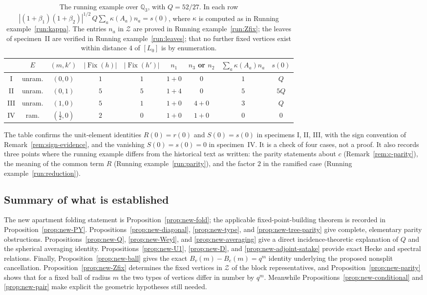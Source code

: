 \documentclass[12pt,letterpaper]{amsart}
\numberwithin{equation}{section}
\theoremstyle{definition}
\theoremstyle{plain}
\begin{document}
\begin{table}[htbp]
\centering
\small
\renewcommand{\arraystretch}{1.25}
\begin{tabular}{@{}ccccccccc@{}}
\toprule
 & $E$ & $(m,k')$ & $|\operatorname{Fix}(h)|$ & $|\operatorname{Fix}(h')|$
 & $n_1$ & $n_3$ or $n_2$ & $\sum_a\kappa(A_a)n_a$ & $s(0)$\\
\midrule
I & unram. & $(0,0)$ & $1$ & $1$ & $1+0$ & $0$ & $1$ & $Q$\\
II & unram. & $(0,1)$ & $5$ & $5$ & $1+4$ & $0$ & $5$ & $5Q$\\
III & unram. & $(1,0)$ & $5$ & $1$ & $1+0$ & $4+0$ & $3$ & $Q$\\
IV & ram. & $(\tfrac12,0)$ & $2$ & $0$ & $1+0$ & $1+0$ & $0$ & $0$\\
\bottomrule
\end{tabular}
\caption{The running example over $\mathbb Q_3$, with $Q=52/27$. In
each row $|(1+\beta_1)(1+\beta_2)|^{1/2}\,Q\sum_a\kappa(A_a)n_a=s(0)$,
where $\kappa$ is computed as in Running example~\ref{run:kappa}.
The entries $n_a$ in $\mathcal Z$ are proved in
Running example~\ref{run:Zfix}; the leaves of specimen~II are verified
in Running example~\ref{run:leaves}; that no further fixed vertices
exist within distance $4$ of $[L_0]$ is by enumeration.
\label{tab:running-summary}}
\end{table}

The table confirms the unit-element identities $R(0)=r(0)$ and
$S(0)=s(0)$ in specimens I, II, III, with the sign convention of
Remark~\ref{rem:sign-evidence}, and the vanishing $S(0)=s(0)=0$ in
specimen~IV. It is a check of four cases, not a proof. It also
records three points where the running example differs from the
historical text as written: the parity statements about $c$
(Remark~\ref{rem:c-parity}), the meaning of the common term $R$
(Running example~\ref{run:parity}), and the factor $2$ in the
ramified case (Running example~\ref{run:reduction}).

\subsection{Summary of what is established}
The new apartment folding statement is
Proposition~\ref{prop:new-fold}; the applicable fixed-point-building
theorem is recorded in Proposition~\ref{prop:new-PY}.
Propositions~\ref{prop:new-diagonal}, \ref{prop:new-type}, and
\ref{prop:new-tree-parity} give complete, elementary parity
obstructions. Propositions~\ref{prop:new-Q},
\ref{prop:new-Weyl}, and \ref{prop:new-averaging} give a direct
incidence-theoretic explanation of $Q$ and the spherical averaging
identity. Propositions~\ref{prop:new-U1}, \ref{prop:new-D}, and
\ref{prop:new-adjoint-satake} provide exact Hecke and spectral
relations. Finally, Proposition~\ref{prop:new-ball} gives the exact
$B_v(m)-B_e(m)=q^m$ identity underlying the proposed
nonsplit cancellation. Proposition~\ref{prop:new-Zfix} determines
the fixed vertices in $\mathcal Z$ of the block representatives, and
Proposition~\ref{prop:new-parity} shows that for a fixed ball of
radius $m$ the two types of vertices differ in number by $q^m$.
Meanwhile
Propositions~\ref{prop:new-conditional} and \ref{prop:new-pair}
make explicit the geometric hypotheses still needed.
\end{document}
